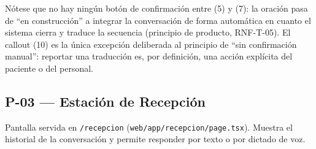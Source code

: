 Nótese que no hay ningún botón de confirmación entre (5) y (7): la oración
pasa de ``en construcción'' a integrar la conversación de forma automática
en cuanto el sistema cierra y traduce la secuencia (principio de producto,
RNF-T-05). El callout (10) es la única excepción deliberada al principio de
``sin confirmación manual'': reportar una traducción es, por definición,
una acción explícita del paciente o del personal.

\subsection{P-03 --- Estación de Recepción}

Pantalla servida en \texttt{/recepcion} (\texttt{web/app/recepcion/page.tsx}).
Muestra el historial de la conversación y permite responder por texto o por
dictado de voz.


